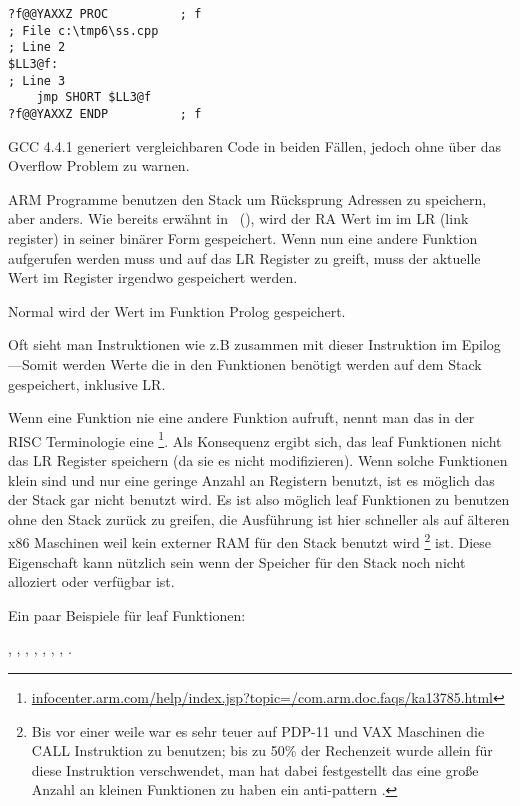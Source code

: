 \begin{lstlisting}[style=customasmx86]
?f@@YAXXZ PROC			; f
; File c:\tmp6\ss.cpp
; Line 2
$LL3@f:
; Line 3
	jmp	SHORT $LL3@f
?f@@YAXXZ ENDP			; f
\end{lstlisting}


GCC 4.4.1 generiert vergleichbaren Code in beiden Fällen, jedoch ohne über das Overflow Problem zu warnen.




ARM Programme benutzen den Stack um Rücksprung Adressen zu speichern, aber anders.
Wie bereits erwähnt in \q{\HelloWorldSectionName}~(),
wird der \ac{RA} Wert im im \ac{LR} (\gls{link register}) in seiner binärer Form gespeichert.
Wenn nun eine andere Funktion aufgerufen werden muss und auf das \ac{LR} Register 
zu greift, muss der aktuelle Wert im Register irgendwo gespeichert werden.

Normal wird der Wert im Funktion Prolog gespeichert.


Oft sieht man Instruktionen wie z.B  zusammen mit dieser Instruktion im 
Epilog ---Somit werden Werte die in den Funktionen benötigt werden auf dem 
Stack gespeichert, inklusive \ac{LR}.

Wenn eine Funktion nie eine andere Funktion aufruft, nennt man das in der \ac{RISC} Terminologie eine
\footnote{\href{http://go.yurichev.com/17064}{infocenter.arm.com/help/index.jsp?topic=/com.arm.doc.faqs/ka13785.html}}.  %
Als Konsequenz ergibt sich, das leaf Funktionen nicht das \ac{LR} Register speichern (da sie es nicht modifizieren).
Wenn solche Funktionen klein sind und nur eine geringe Anzahl an Registern benutzt, ist es möglich das der Stack
gar nicht benutzt wird. Es ist also möglich leaf Funktionen zu benutzen ohne den Stack zurück zu greifen, die Ausführung
ist hier schneller als auf älteren x86 Maschinen weil kein externer RAM für den Stack benutzt wird 
\footnote{Bis vor einer weile war es sehr teuer auf PDP-11 und VAX Maschinen die CALL Instruktion zu benutzen; bis zu 50\%
der Rechenzeit wurde allein für diese Instruktion verschwendet, man hat dabei festgestellt das eine große Anzahl an kleinen
Funktionen zu haben ein \gls{anti-pattern} .} ist.
Diese Eigenschaft kann nützlich sein wenn der Speicher für den Stack noch nicht alloziert oder verfügbar ist.

Ein paar Beispiele für leaf Funktionen:

, , 
, , ,
, , .

